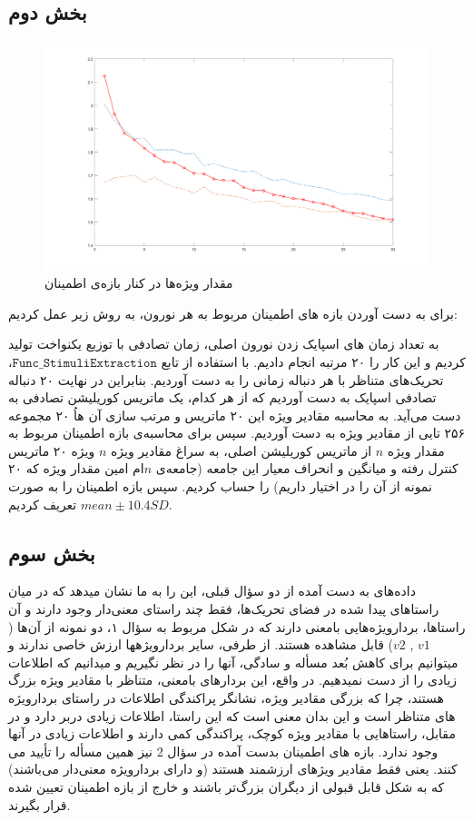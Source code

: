 \documentclass[12pt,onecolumn,a4paper,fleqn]{article}
\newcommand{\pf}[1]{$\mathtt{#1}$}
\begin{document}
\subsection{بخش دوم}

\begin{figure}[ht]
	\centering
	\includegraphics[width=0.6\linewidth]{photos/4_2.png}
	\caption{مقدار ویژه‌ها در کنار بازه‌ی اطمینان }
\end{figure}
برای به دست آوردن بازه های اطمینان مربوط به هر نورون، به روش زیر عمل کردیم:

به تعداد زمان های اسپایک زدن نورون اصلی، زمان تصادفی با توزیع یکنواخت تولید کردیم و این کار را ۲۰ مرتبه انجام دادیم. با استفاده از تابع \pf{Func\_StimuliExtraction }، تحریک‌های متناظر با هر دنباله زمانی را به دست آوردیم. بنابراین در نهایت ۲۰ دنباله تصادفی اسپایک به دست آوردیم که از هر کدام، یک ماتریس کوریلیشن تصادفی به دست می‌آید. به محاسبه مقادیر ویژه این ۲۰ ماتریس و مرتب سازی آن هاُ ۲۰ مجموعه ۲۵۶ تایی از مقادیر ویژه به دست آوردیم. سپس برای محاسبه‌ی بازه اطمینان مربوط به مقدار ویژه $ n $ از ماتریس کوریلیشن اصلی، به سراغ مقادیر ویژه $ n $ ویژه ۲۰ ماتریس کنترل رفته و میانگین و انحراف معیار این جامعه (جامعه‌ی $ n  $ام امین مقدار ویژه که ۲۰ نمونه از آن را در اختیار داریم) را حساب کردیم. سپس بازه اطمینان را به صورت $ mean \pm 10.4SD $ تعریف کردیم.

\subsection{بخش سوم}
داده‌های به دست آمده از دو سؤال قبلی، این را به ما نشان میدهد که در میان راستاهای پیدا شده در فضای تحریک‌‌ها، فقط چند راستای معنی‌دار وجود دارند و آن راستاها، بردارویژه‌هایی بامعنی دارند که در شکل مربوط به سؤال ۱، دو نمونه از آن‌ها ($ v1 $ , $ v2 $) قابل مشاهده هستند. از طرفی، سایر بردارویژهها ارزش خاصی ندارند و میتوانیم برای کاهش بُعد مسأله و سادگی، آنها را در نظر نگیریم و میدانیم که اطلاعات زیادی را از دست نمیدهیم. در واقع، این بردارهای بامعنی، متناظر با مقادیر ویژه بزرگ هستند، چرا که بزرگی مقادیر ویژه، نشانگر پراکندگی اطلاعات در راستای بردارویژه های متناظر است و این بدان معنی است که این راستا، اطلاعات زیادی دربر دارد و در مقابل، راستاهایی با مقادیر ویژه کوچک، پراکندگی کمی دارند و اطلاعات زیادی در آنها وجود ندارد.
بازه های اطمینان بدست آمده در سؤال 2 نیز همین مسأله را تأیید می کنند. یعنی فقط مقادیر ویژهای ارزشمند هستند (و دارای بردارویژه معنی‌دار می‌باشند) که به شکل قابل قبولی از دیگران بزرگ‌تر باشند و خارج از بازه اطمینان تعیین شده قرار بگیرند.
\pagebreak
\end{document}
